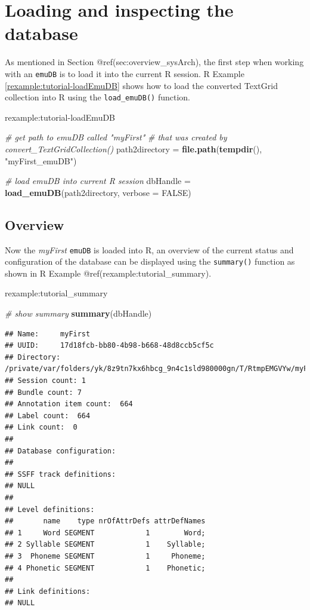 \documentclass[]{book}
\newenvironment{Shaded}{\begin{snugshade}}{\end{snugshade}}
\newcommand{\CommentTok}[1]{\textcolor[rgb]{0.56,0.35,0.01}{\textit{#1}}}
\newcommand{\DataTypeTok}[1]{\textcolor[rgb]{0.13,0.29,0.53}{#1}}
\newcommand{\KeywordTok}[1]{\textcolor[rgb]{0.13,0.29,0.53}{\textbf{#1}}}
\newcommand{\NormalTok}[1]{#1}
\newcommand{\OtherTok}[1]{\textcolor[rgb]{0.56,0.35,0.01}{#1}}
\newcommand{\StringTok}[1]{\textcolor[rgb]{0.31,0.60,0.02}{#1}}
\theoremstyle{definition}
\theoremstyle{definition}
\theoremstyle{definition}
\theoremstyle{remark}
\begin{document}
\hypertarget{loading-and-inspecting-the-database}{%
\section{Loading and inspecting the
database}\label{loading-and-inspecting-the-database}}

As mentioned in Section @ref(sec:overview\_sysArch), the first step when
working with an \texttt{emuDB} is to load it into the current R session.
R Example \ref{rexample:tutorial-loadEmuDB} shows how to load the
converted TextGrid collection into R using the \texttt{load\_emuDB()}
function.

rexample:tutorial-loadEmuDB

\begin{Shaded}
\begin{Highlighting}[]
\CommentTok{# get path to emuDB called "myFirst"}
\CommentTok{# that was created by convert_TextGridCollection()}
\NormalTok{path2directory =}\StringTok{ }\KeywordTok{file.path}\NormalTok{(}\KeywordTok{tempdir}\NormalTok{(), }\StringTok{"myFirst_emuDB"}\NormalTok{)}

\CommentTok{# load emuDB into current R session}
\NormalTok{dbHandle =}\StringTok{ }\KeywordTok{load_emuDB}\NormalTok{(path2directory, }\DataTypeTok{verbose =} \OtherTok{FALSE}\NormalTok{)}
\end{Highlighting}
\end{Shaded}

\hypertarget{overview}{%
\subsection{Overview}\label{overview}}

Now the \emph{myFirst} \texttt{emuDB} is loaded into R, an overview of
the current status and configuration of the database can be displayed
using the \texttt{summary()} function as shown in R Example
@ref(rexample:tutorial\_summary).

rexample:tutorial\_summary

\begin{Shaded}
\begin{Highlighting}[]
\CommentTok{# show summary}
\KeywordTok{summary}\NormalTok{(dbHandle)}
\end{Highlighting}
\end{Shaded}

\begin{verbatim}
## Name:     myFirst 
## UUID:     17d18fcb-bb80-4b98-b668-48d8ccb5cf5c 
## Directory:    /private/var/folders/yk/8z9tn7kx6hbcg_9n4c1sld980000gn/T/RtmpEMGVYw/myFirst_emuDB 
## Session count: 1 
## Bundle count: 7 
## Annotation item count:  664 
## Label count:  664 
## Link count:  0 
## 
## Database configuration:
## 
## SSFF track definitions:
## NULL
## 
## Level definitions:
##       name    type nrOfAttrDefs attrDefNames
## 1     Word SEGMENT            1        Word;
## 2 Syllable SEGMENT            1    Syllable;
## 3  Phoneme SEGMENT            1     Phoneme;
## 4 Phonetic SEGMENT            1    Phonetic;
## 
## Link definitions:
## NULL
\end{verbatim}
\end{document}
